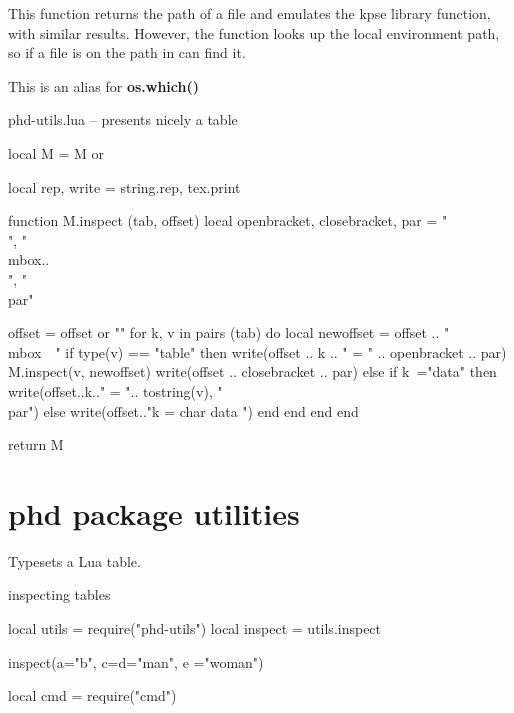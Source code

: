  
  This function returns the path of a file and emulates the kpse library function, with similar results. However, the function looks up the local environment path, so if a file is on the path in can find it.

 This is an alias for \textbf{os.which()}

\begin{teXXX}{phd-utils.lua}
-- presents nicely a table 

local M = M or {}

local rep, write = string.rep, tex.print

function M.inspect (tab, offset)
   local openbracket, closebracket, par = "\\{", "\\mbox{..}\\}", "\\par"
   
    offset = offset or ""
    for k, v in pairs (tab) do
        local newoffset = offset .. "\\mbox{~~}"
        if type(v) == "table" then
           write(offset .. k .. " = " .. openbracket .. par)
           M.inspect(v, newoffset)
           write(offset .. closebracket .. par)
        else
         if k~="data" then write(offset..k.." =  ".. tostring(v), "\\par") 
           else
                 write(offset.."k = char data ")
           end
       end
    end
end

return M
\end{teXXX}

\section{phd package utilities}

 Typesets a Lua table. 

\begin{texexample}{inspecting tables}{}
\begin{luacode}
local utils = require("phd-utils")
local inspect = utils.inspect

inspect({a="b", c={d="man", e ="woman"}})

local cmd = require("cmd")


\end{luacode}

\test
\end{texexample}


